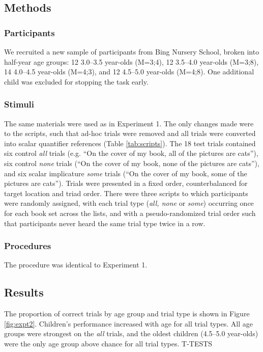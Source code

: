 \documentclass[10pt,letterpaper]{article}
\begin{document}
\subsection{Methods}

\subsubsection{Participants}

We recruited a new sample of participants from Bing Nursery School, broken into half-year age groups: 12 3.0--3.5 year-olds (M=3;4), 12 3.5--4.0 year-olds (M=3;8), 14 4.0--4.5 year-olds (M=4;3), and 12 4.5--5.0 year-olds (M=4;8).  One additional child was excluded for stopping the task early. 

\subsubsection{Stimuli}

The same materials were used as in Experiment 1. The only changes made were to the scripts, such that ad-hoc trials were removed and all trials were converted into scalar quantifier references (Table \ref{tab:scripts}).  The 18 test trials contained six control \emph{all} trials (e.g. ``On the cover of my book, all of the pictures are cats''), six control \emph{none} trials (``On the cover of my book, none of the pictures are cats''), and six scalar implicature \emph{some} trials (``On the cover of my book, some of the pictures are cats'').  Trials were presented in a fixed order, counterbalanced for target location and triad order.  There were three scripts to which participants were randomly assigned, with each trial type (\emph{all, none} or \emph{some}) occurring once for each book set across the lists, and with a pseudo-randomized trial order such that participants never heard the same trial type twice in a row. 

\subsubsection{Procedures}

The procedure was identical to Experiment 1. 

\subsection{Results}

The proportion of correct trials by age group and trial type is shown in Figure \ref{fig:expt2}.  Children's performance increased with age for all trial types. All age groups were strongest on the \emph{all} trials, and the oldest children (4.5--5.0 year-olds) were the only age group above chance for all trial types.  T-TESTS
\end{document}
